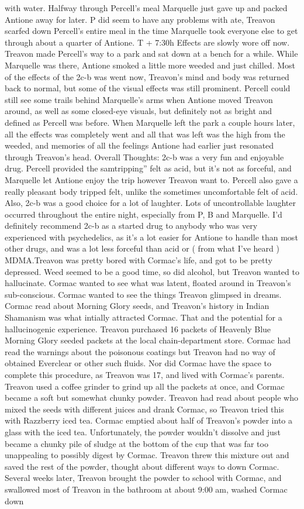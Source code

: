 \documentclass[12pt]{book}
\begin{document}
with water. Halfway through Percell's meal Marquelle just gave up and packed Antione away for later. P did seem to have any problems with ate, Treavon scarfed down Percell's entire meal in the time Marquelle took everyone else to get through about a quarter of Antione. T + 7:30h Effects are slowly wore off now. Treavon made Percell's way to a park and sat down at a bench for a while. While Marquelle was there, Antione smoked a little more weeded and just chilled. Most of the effects of the 2c-b was went now, Treavon's mind and body was returned back to normal, but some of the visual effects was still prominent. Percell could still see some trails behind Marquelle's arms when Antione moved Treavon around, as well as some closed-eye visuals, but definitely not as bright and defined as Percell was before. When Marquelle left the park a couple hours later, all the effects was completely went and all that was left was the high from the weeded, and memories of all the feelings Antione had earlier just resonated through Treavon's head. Overall Thoughts: 2c-b was a very fun and enjoyable drug. Percell provided the samtripping'' felt as acid, but it's not as forceful, and Marquelle let Antione enjoy the trip however Treavon want to. Percell also gave a really pleasant body tripped felt, unlike the sometimes uncomfortable felt of acid. Also, 2c-b was a good choice for a lot of laughter. Lots of uncontrollable laughter occurred throughout the entire night, especially from P, B and Marquelle. I'd definitely recommend 2c-b as a started drug to anybody who was very experienced with psychedelics, as it's a lot easier for Antione to handle than most other drugs, and was a lot less forceful than acid or ( from what I've heard ) MDMA.Treavon was pretty bored with Cormac's life, and got to be pretty depressed. Weed seemed to be a good time, so did alcohol, but Treavon wanted to hallucinate. Cormac wanted to see what was latent, floated around in Treavon's sub-conscious. Cormac wanted to see the things Treavon glimpsed in dreams. Cormac read about Morning Glory seeds, and Treavon's history in Indian Shamanism was what intially attracted Cormac. That and the potential for a hallucinogenic experience. Treavon purchased 16 packets of Heavenly Blue Morning Glory seeded packets at the local chain-department store. Cormac had read the warnings about the poisonous coatings but Treavon had no way of obtained Everclear or other such fluids. Nor did Cormac have the space to complete this procedure, as Treavon was 17, and lived with Cormac's parents. Treavon used a coffee grinder to grind up all the packets at once, and Cormac became a soft but somewhat chunky powder. Treavon had read about people who mixed the seeds with different juices and drank Cormac, so Treavon tried this with Razzberry iced tea. Cormac emptied about half of Treavon's powder into a glass with the iced tea. Unfortunately, the powder wouldn't dissolve and just became a chunky pile of sludge at the bottom of the cup that was far too unappealing to possibly digest by Cormac. Treavon threw this mixture out and saved the rest of the powder, thought about different ways to down Cormac. Several weeks later, Treavon brought the powder to school with Cormac, and swallowed most of Treavon in the bathroom at about 9:00 am, washed Cormac down 
\end{document}
